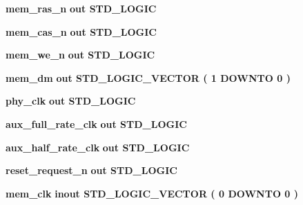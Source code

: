 \begin{DoxyCompactItemize}
\item 
{\bf mem\+\_\+ras\+\_\+n}  {\bfseries {\bfseries \textcolor{keywordflow}{out}\textcolor{vhdlchar}{ }}} {\bfseries \textcolor{comment}{S\+T\+D\+\_\+\+L\+O\+G\+IC}\textcolor{vhdlchar}{ }} 
\item 
{\bf mem\+\_\+cas\+\_\+n}  {\bfseries {\bfseries \textcolor{keywordflow}{out}\textcolor{vhdlchar}{ }}} {\bfseries \textcolor{comment}{S\+T\+D\+\_\+\+L\+O\+G\+IC}\textcolor{vhdlchar}{ }} 
\item 
{\bf mem\+\_\+we\+\_\+n}  {\bfseries {\bfseries \textcolor{keywordflow}{out}\textcolor{vhdlchar}{ }}} {\bfseries \textcolor{comment}{S\+T\+D\+\_\+\+L\+O\+G\+IC}\textcolor{vhdlchar}{ }} 
\item 
{\bf mem\+\_\+dm}  {\bfseries {\bfseries \textcolor{keywordflow}{out}\textcolor{vhdlchar}{ }}} {\bfseries \textcolor{comment}{S\+T\+D\+\_\+\+L\+O\+G\+I\+C\+\_\+\+V\+E\+C\+T\+OR}\textcolor{vhdlchar}{ }\textcolor{vhdlchar}{(}\textcolor{vhdlchar}{ }\textcolor{vhdlchar}{ } \textcolor{vhdldigit}{1} \textcolor{vhdlchar}{ }\textcolor{keywordflow}{D\+O\+W\+N\+TO}\textcolor{vhdlchar}{ }\textcolor{vhdlchar}{ } \textcolor{vhdldigit}{0} \textcolor{vhdlchar}{ }\textcolor{vhdlchar}{)}\textcolor{vhdlchar}{ }} 
\item 
{\bf phy\+\_\+clk}  {\bfseries {\bfseries \textcolor{keywordflow}{out}\textcolor{vhdlchar}{ }}} {\bfseries \textcolor{comment}{S\+T\+D\+\_\+\+L\+O\+G\+IC}\textcolor{vhdlchar}{ }} 
\item 
{\bf aux\+\_\+full\+\_\+rate\+\_\+clk}  {\bfseries {\bfseries \textcolor{keywordflow}{out}\textcolor{vhdlchar}{ }}} {\bfseries \textcolor{comment}{S\+T\+D\+\_\+\+L\+O\+G\+IC}\textcolor{vhdlchar}{ }} 
\item 
{\bf aux\+\_\+half\+\_\+rate\+\_\+clk}  {\bfseries {\bfseries \textcolor{keywordflow}{out}\textcolor{vhdlchar}{ }}} {\bfseries \textcolor{comment}{S\+T\+D\+\_\+\+L\+O\+G\+IC}\textcolor{vhdlchar}{ }} 
\item 
{\bf reset\+\_\+request\+\_\+n}  {\bfseries {\bfseries \textcolor{keywordflow}{out}\textcolor{vhdlchar}{ }}} {\bfseries \textcolor{comment}{S\+T\+D\+\_\+\+L\+O\+G\+IC}\textcolor{vhdlchar}{ }} 
\item 
{\bf mem\+\_\+clk}  {\bfseries {\bfseries \textcolor{keywordflow}{inout}\textcolor{vhdlchar}{ }}} {\bfseries \textcolor{comment}{S\+T\+D\+\_\+\+L\+O\+G\+I\+C\+\_\+\+V\+E\+C\+T\+OR}\textcolor{vhdlchar}{ }\textcolor{vhdlchar}{(}\textcolor{vhdlchar}{ }\textcolor{vhdlchar}{ } \textcolor{vhdldigit}{0} \textcolor{vhdlchar}{ }\textcolor{keywordflow}{D\+O\+W\+N\+TO}\textcolor{vhdlchar}{ }\textcolor{vhdlchar}{ } \textcolor{vhdldigit}{0} \textcolor{vhdlchar}{ }\textcolor{vhdlchar}{)}\textcolor{vhdlchar}{ }} 

\end{DoxyCompactItemize}
